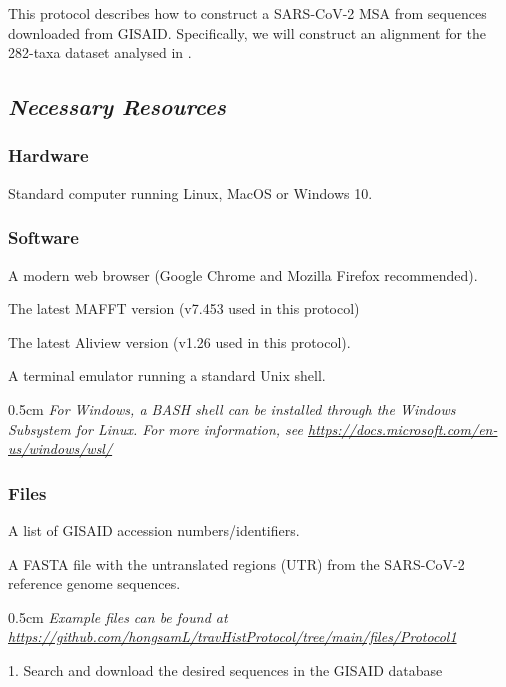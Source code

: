 \documentclass{article}
\newcommand{\ann}[1]{
\begin{adjustwidth}{0.5cm}{}
\it{#1}\\
\end{adjustwidth}}
\begin{document}
This protocol describes how to construct a SARS-CoV-2 MSA from sequences downloaded from GISAID. Specifically, we will construct an alignment for the 282-taxa dataset analysed in \cite{travhist}. 

\subsection*{\textbf{\textit{Necessary Resources}}}
\subsubsection*{Hardware}
\hspace{0.5cm}Standard computer running Linux, MacOS or Windows 10. 

\subsubsection*{Software}
\hspace{0.5cm}A modern web browser (Google Chrome and Mozilla Firefox recommended).

\hspace{0.5cm}The latest MAFFT \cite{mafft} version (v7.453 used in this protocol) 

\hspace{0.5cm}The latest Aliview \cite{aliview} version (v1.26 used in this protocol).

\hspace{0.5cm}A terminal emulator running a standard Unix shell. \\
\ann{For Windows, a BASH shell can be installed through the Windows Subsystem for Linux. For more information, see \url{https://docs.microsoft.com/en-us/windows/wsl/}}

\subsubsection*{Files}
\hspace{0.5cm}A list of GISAID accession numbers/identifiers. 

\hspace{0.5cm}A FASTA file with the untranslated regions (UTR) from the SARS-CoV-2 reference genome sequences.\\
\ann{Example files can be found at \\
\url{https://github.com/hongsamL/travHistProtocol/tree/main/files/Protocol1}} 

1. Search and download the desired sequences in the GISAID database \\
\end{document}
